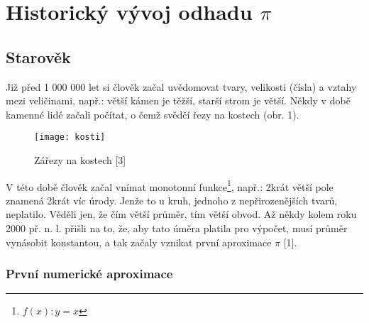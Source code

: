 \documentclass[rocnikovka]{gzwroc} %
\begin{document}
\section{Historický vývoj odhadu $\pi$}
\subsection{Starověk}
Již před 1 000 000 let si člověk začal uvědomovat tvary, velikosti (čísla) a vztahy mezi veličinami, např.: větší kámen je těžší, starší strom je větší. Někdy v době kamenné lidé začali počítat, o čemž svědčí řezy na kostech (obr. 1).
\begin{figure}[!ht]
\texttt{[image: kosti]}
\caption{Zářezy na kostech [3]}
\label{fig:kruh}
\end{figure}
V této době člověk začal vnímat monotonní funkce\footnote[4]{$f(x): y=x$}, např.: 2krát větší pole znamená 2krát víc úrody. Jenže to u kruh, jednoho z nepřirozenějších tvarů, neplatilo. Věděli jen, že čím větší průměr, tím větší obvod. Až někdy kolem roku 2000 př. n. l. přišli na to, že, aby tato úměra platila pro výpočet, musí  průměr vynásobit konstantou, a tak začaly vznikat první aproximace $\pi$ [1].
\subsubsection{První numerické aproximace}
\end{document}
